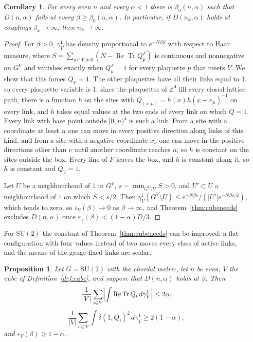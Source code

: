 \documentclass[11pt]{amsart}
\newtheorem{proposition}[theorem]{Proposition}
\newtheorem{corollary}[theorem]{Corollary}
\theoremstyle{definition}
\theoremstyle{remark}
\numberwithin{equation}{section}
\newcommand{\Z}{\mathbb{Z}}
\newcommand{\SU}{\mathrm{SU}}
\newcommand{\ReTr}{\operatorname{Re}\operatorname{Tr}}
\begin{document}
\begin{corollary}\label{cor:cubefails}
For every even $n$ and every $\alpha<1$ there is $\beta_0(n,\alpha)$ such that
$D(n,\alpha)$ fails at every $\beta\ge\beta_0(n,\alpha)$. In particular, if
$D(n_k,\alpha)$ holds at couplings $\beta_k\to\infty$, then $n_k\to\infty$.
\end{corollary}

\begin{proof}
For $\beta>0$, $\gamma^1_V$ has density proportional to $e^{-N\beta S}$ with
respect to Haar measure, where $S=\sum_{p\cap V\ne\emptyset}(N-\ReTr Q^F_p)$
is continuous and nonnegative on $G^V$ and vanishes exactly when $Q^F_p=1$
for every plaquette $p$ that meets $V$. We show that this forces $Q_V=1$.
The other plaquettes have all their links equal to $1$, so every plaquette
variable is $1$; since the plaquettes of $\Z^4$ fill every closed lattice
path, there is a function $h$ on the sites with $Q_{(x,\mu)}=h(x)h(x+e_\mu)^{-1}$
on every link, and $h$ takes equal values at the two ends of every link on
which $Q=1$. Every link with base point outside $[0,n)^4$ is such a link. From
a site with a coordinate at least $n$ one can move in every positive
direction along links of this kind, and from a site with a negative
coordinate $x_\nu$ one can move in the positive directions other than $\nu$
until another coordinate reaches $n$; so $h$ is constant on the sites outside
the box. Every line of $F$ leaves the box, and $h$ is constant along it, so
$h$ is constant and $Q_V=1$.

Let $U$ be a neighbourhood of $1$ in $G^V$, $s=\min_{G^V\setminus U}S>0$, and
$U'\subset U$ a neighbourhood of $1$ on which $S<s/2$. Then
$\gamma^1_V(G^V\setminus U)\le e^{-N\beta s}/(|U'|e^{-N\beta s/2})$, which
tends to zero, so $\varepsilon_V(\beta)\to0$ as $\beta\to\infty$, and
Theorem~\ref{thm:cubeneeds} excludes $D(n,\alpha)$ once
$\varepsilon_V(\beta)<(1-\alpha)D/3$.
\end{proof}

For $\SU(2)$ the constant of Theorem~\ref{thm:cubeneeds} can be improved: a
flat configuration with four values instead of two moves every class of
active links, and the means of the gauge-fixed links are scalar.

\begin{proposition}\label{prop:tetra}
Let $G=\SU(2)$ with the chordal metric, let $n$ be even, $V$ the cube of
Definition~\ref{def:cube}, and suppose that $D(n,\alpha)$ holds at $\beta$.
Then
\[
\frac1{|V|}\sum_{i\in V}\Bigl|\int\ReTr Q_i\,d\gamma^1_V\Bigr|\le2\alpha,
\]
\[
\frac1{|V|}\sum_{i\in V}\int\delta(1,Q_i)^2\,d\gamma^1_V\ge2(1-\alpha),
\]
and $\varepsilon_V(\beta)\ge1-\alpha$.
\end{proposition}
\end{document}
